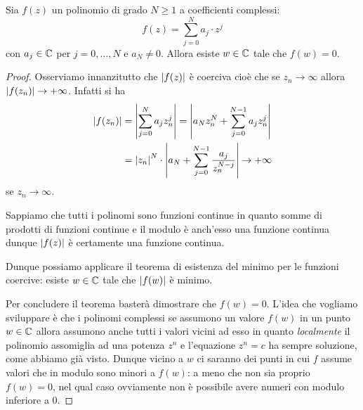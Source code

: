 \begin{theorem}
\label{th:fondamentale_algebra}
%
%
Sia $f(z)$ un polinomio di grado $N\ge 1$ a coefficienti complessi:
\[
  f(z) = \sum_{j=0}^N a_j \cdot z^j
\]
con $a_j\in {\mathbb C}$ per $j=0,\dots,N$ e $a_N \neq 0$.
Allora esiste $w\in {\mathbb C}$ tale che $f(w) = 0$.
\end{theorem}
%
\begin{proof}
  Osserviamo innanzitutto che ${\left|f(z)\right|}$ è coerciva cioè che
  se $z_n \to \infty$ allora ${\left|f(z_n)\right|}\to +\infty$.
  Infatti si ha
  \begin{align*}
    {\left|f(z_n)\right|}
    &= {\left|\sum_{j=0}^N a_j z_n^j\right|}
    = {\left|a_N z_n^N  + \sum_{j=0}^{N-1} a_j z_n^j\right|}\\
    &= {\left|z_n\right|}^N \cdot {\left|a_N + \sum_{j=0}^{N-1} \frac{a_j}{z_n^{N-j}}\right|}
    \to +\infty
  \end{align*}
  se $z_n \to \infty$.
  
  Sappiamo che tutti i polinomi sono funzioni continue in quanto somme di 
  prodotti di funzioni continue e il modulo è anch'esso una funzione continua 
  dunque ${\left|f(z)\right|}$ è certamente una funzione continua.
  
  Dunque possiamo applicare il teorema di esistenza del minimo per le funzioni 
  coercive: esiste $w\in {\mathbb C}$ tale che ${\left|f(w)\right|}$ è minimo.
  
  Per concludere il teorema basterà dimostrare che $f(w)=0$.
  L'idea che vogliamo sviluppare è che i polinomi complessi se assumono un valore
  $f(w)$ in un punto $w\in {\mathbb C}$ allora assumono anche tutti i valori vicini
  ad esso in quanto \emph{localmente} il polinomio assomiglia ad una potenza $z^n$
  e l'equazione $z^n=c$ ha sempre soluzione, come abbiamo già visto.
  Dunque vicino a $w$ ci saranno dei punti in cui $f$ assume valori che in modulo 
  sono minori a $f(w)$: a meno che non sia proprio $f(w)=0$, nel qual caso 
  ovviamente non è possibile avere numeri con modulo inferiore a $0$.
  

\end{proof}
